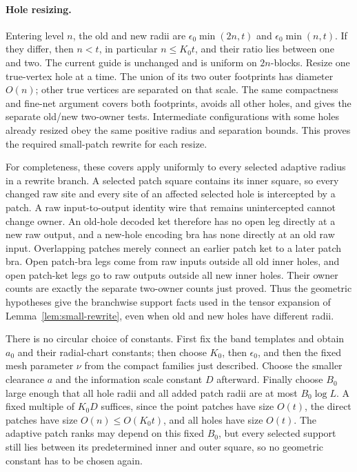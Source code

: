 \documentclass[11pt]{article}
\numberwithin{equation}{section}
\theoremstyle{definition}
\theoremstyle{remark}
\begin{document}
\paragraph{Hole resizing.}
Entering level $n$, the old and new radii are
$\epsilon_0\min(2n,t)$ and $\epsilon_0\min(n,t)$.  If they differ,
then $n<t$, in particular $n\le K_0t$, and their ratio lies between
one and two.  The current guide is unchanged and is uniform on
$2n$-blocks.  Resize one true-vertex hole at a time.  The union of
its two outer footprints has diameter $O(n)$; other true vertices
are separated on that scale.  The same compactness and fine-net
argument covers both footprints, avoids all other holes, and gives
the separate old/new two-owner tests.  Intermediate configurations
with some holes already resized obey the same positive radius and
separation bounds.  This proves the required small-patch rewrite for
each resize.

For completeness, these covers apply uniformly to every selected
adaptive radius in a rewrite branch.  A selected patch square
contains its inner square, so every changed raw site and every site
of an affected selected hole is intercepted by a patch.  A raw
input-to-output identity wire that remains unintercepted cannot
change owner.  An old-hole decoded ket therefore has no open leg
directly at a new raw output, and a new-hole encoding bra has none
directly at an old raw input.  Overlapping patches merely connect an
earlier patch ket to a later patch bra.  Open patch-bra legs come
from raw inputs outside all old inner holes, and open patch-ket legs
go to raw outputs outside all new inner holes.  Their owner counts
are exactly the separate two-owner counts just proved.  Thus the
geometric hypotheses give the branchwise support facts used in the
tensor expansion of Lemma~\ref{lem:small-rewrite}, even when old
and new holes have different radii.

There is no circular choice of constants.  First fix the band
templates and obtain $a_0$ and their radial-chart constants; then
choose $K_0$, then $\epsilon_0$, and then the fixed mesh parameter
$\nu$ from the compact families just described.  Choose the smaller
clearance $a$ and the information scale constant $D$ afterward.
Finally choose $B_0$ large enough that all hole radii and all added
patch radii are at most $B_0\log L$.  A fixed multiple of $K_0D$
suffices, since the point patches have size $O(t)$, the direct
patches have size $O(n)\le O(K_0t)$, and all holes have size $O(t)$.
The adaptive patch ranks may depend on this fixed $B_0$, but every
selected support still lies between its predetermined inner and
outer square, so no geometric constant has to be chosen again.
\end{document}
